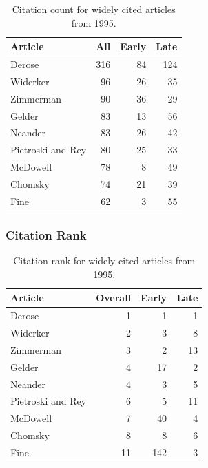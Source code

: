 \documentclass[
  10pt,
  letterpaper,
  DIV=11,
  numbers=noendperiod,
  twoside]{scrartcl}
\begin{document}
\begin{longtable}[]{@{}lrrr@{}}

\caption{\label{tbl-citation-count-1995}Citation count for widely cited
articles from 1995.}

\tabularnewline

\toprule\noalign{}
Article & All & Early & Late \\
\midrule\noalign{}
\endhead
\bottomrule\noalign{}
\endlastfoot
Derose & 316 & 84 & 124 \\
Widerker & 96 & 26 & 35 \\
Zimmerman & 90 & 36 & 29 \\
Gelder & 83 & 13 & 56 \\
Neander & 83 & 26 & 42 \\
Pietroski and Rey & 80 & 25 & 33 \\
McDowell & 78 & 8 & 49 \\
Chomsky & 74 & 21 & 39 \\
Fine & 62 & 3 & 55 \\

\end{longtable}

\subsubsection*{Citation Rank}\label{citation-rank-19}

\begin{longtable}[]{@{}lrrr@{}}

\caption{\label{tbl-citation-rank-1995}Citation rank for widely cited
articles from 1995.}

\tabularnewline

\toprule\noalign{}
Article & Overall & Early & Late \\
\midrule\noalign{}
\endhead
\bottomrule\noalign{}
\endlastfoot
Derose & 1 & 1 & 1 \\
Widerker & 2 & 3 & 8 \\
Zimmerman & 3 & 2 & 13 \\
Gelder & 4 & 17 & 2 \\
Neander & 4 & 3 & 5 \\
Pietroski and Rey & 6 & 5 & 11 \\
McDowell & 7 & 40 & 4 \\
Chomsky & 8 & 8 & 6 \\
Fine & 11 & 142 & 3 \\

\end{longtable}
\end{document}
